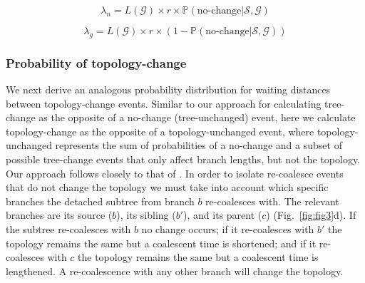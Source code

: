 \documentclass[11pt]{article}
\begin{document}
\begin{equation}
	\lambda_{n} = 
	L(\mathcal{G}) \times r \times 
	\mathbb{P}(\text{no-change} | \mathcal{S},\mathcal{G})
\end{equation}


\begin{equation}
	\lambda_{g} = 
	L(\mathcal{G}) \times r \times 
	(1 - \mathbb{P}(\text{no-change} | \mathcal{S},\mathcal{G}))
\end{equation}



\subsubsection{Probability of topology-change}

We next derive an analogous probability distribution for waiting distances 
between topology-change events.
Similar to our approach for calculating tree-change as the opposite of a 
no-change (tree-unchanged) event, here we calculate topology-change as the 
opposite of a topology-unchanged event, where topology-unchanged represents the 
sum of probabilities of a no-change and a subset of possible tree-change events 
that only affect branch lengths, but not the topology. 
Our approach follows closely to that of \citet{deng_distribution_2021}.
In order to isolate re-coalesce events that do not change the topology
we must take into account which specific branches the detached subtree from 
branch $b$ re-coalesces with. The relevant branches are its source ($b$), 
its sibling ($b'$), and its parent ($c$) (Fig.~\ref{fig:fig3}d). 
If the subtree re-coalesces with $b$ no change occurs; if it re-coalesces
with $b'$ the topology remains the same but a coalescent time is shortened;
and if it re-coalesces with $c$ the topology remains the same but a coalescent 
time is lengthened. A re-coalescence with any other branch will change the topology.
\end{document}
